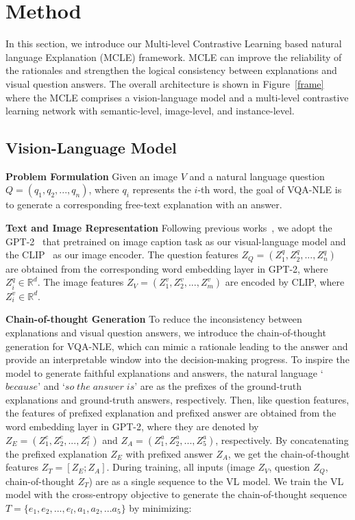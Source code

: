 \documentclass[letterpaper]{article} %
\begin{document}
\section{Method}
In this section, we introduce our Multi-level Contrastive Learning based natural language Explanation (MCLE) framework. MCLE can improve the reliability of the rationales and strengthen the logical consistency between explanations and visual question answers. The overall architecture is shown in Figure~\ref{frame} where the MCLE comprises a vision-language model and a multi-level contrastive learning network with semantic-level, image-level, and instance-level. 

\subsection{Vision-Language Model}\label{vl}

\noindent
\textbf{Problem Formulation} Given an image $V$ and a natural language question $Q=(q_1,q_2,...,q_n)$, where $q_i$ represents the $i$-th word, the goal of VQA-NLE is to generate a corresponding free-text explanation with an answer. 

\noindent
\textbf{Text and Image Representation} Following previous works~\cite{sammani2022nlx}, we adopt the GPT-2~\cite{radford2019language} that pretrained on image caption task as our visual-language model and the CLIP~\cite{radford2021learning} as our image encoder. The question features $Z_Q=(Z^q_1,Z^q_2,...,Z^q_n)$ are obtained from the corresponding word embedding layer in GPT-2, where $Z^q_i\in \mathbb{R}^{d}$. The image features $Z_V=(Z^v_1,Z^v_2,...,Z^v_m)$ are encoded by CLIP, where $Z^v_i\in \mathbb{R}^{d}$.

\noindent
\textbf{Chain-of-thought Generation} To reduce the inconsistency between explanations and visual question answers, we introduce the chain-of-thought generation for VQA-NLE, which can mimic a rationale leading to the answer and provide an interpretable window into the decision-making progress. To inspire the model to generate faithful explanations and answers, the natural language `$because$' and `$so\;the\;answer\;is$' are as the prefixes of the ground-truth explanations and ground-truth answers, respectively. Then, like question features, the features of prefixed explanation and prefixed answer are obtained from the word embedding layer in GPT-2, where they are denoted by $Z_E=(Z^e_1,Z^e_2,...,Z^e_l)$ and $Z_A=(Z^a_1,Z^a_2,...,Z^a_5)$, respectively. By concatenating the prefixed explanation $Z_E$ with prefixed answer $Z_A$, we get the chain-of-thought features $Z_T=[Z_E;Z_A]$.  During training, all inputs (image $Z_V$, question $Z_Q$, chain-of-thought $Z_T$) are as a single sequence to the VL model. We train the VL model with the cross-entropy objective to generate the chain-of-thought sequence ${T} =  \{e_1,e_2,...,e_l,a_1,a_2,...a_5\}$ by minimizing:
\end{document}

